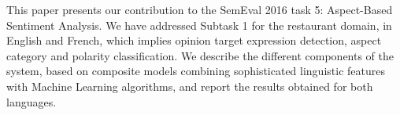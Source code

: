 This paper presents our contribution to the SemEval 2016 task 5: Aspect-Based Sentiment Analysis. We have addressed Subtask 1 for the restaurant domain, in English and French, which implies opinion target expression detection, aspect category and polarity classification. We describe the different components of the system, based on composite models combining sophisticated linguistic features with Machine Learning algorithms, and report the results obtained for both languages.
